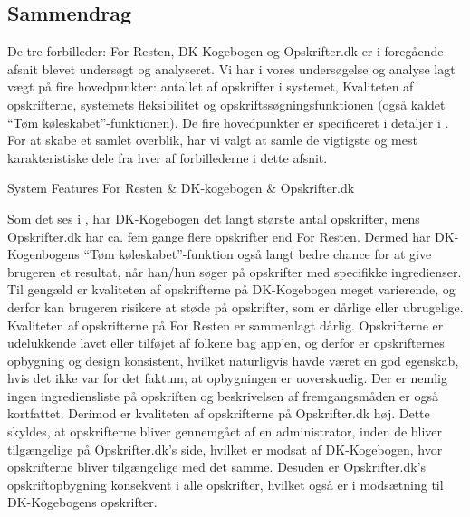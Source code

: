 \subsection{Sammendrag}
\label{subsec:eksisterende.sammendrag}

De tre forbilleder: For Resten, DK-Kogebogen og Opskrifter.dk er i foregående afsnit blevet undersøgt og analyseret. Vi har i vores undersøgelse og analyse lagt vægt på fire hovedpunkter: antallet af opskrifter i systemet, Kvaliteten af opskrifterne, systemets fleksibilitet og opskriftssøgningsfunktionen (også kaldet ``Tøm køleskabet''-funktionen). De fire hovedpunkter er specificeret i detaljer i . For at skabe et samlet overblik, har vi valgt at samle de vigtigste og mest karakteristiske dele fra hver af forbillederne i dette afsnit.

                                            {System}
       { Features                  }{ For Resten   & DK-kogebogen   & Opskrifter.dk }{
}

Som det ses i , har DK-Kogebogen det langt største antal opskrifter, mens Opskrifter.dk har ca. fem gange flere opskrifter end For Resten. Dermed har DK-Kogenbogens ``Tøm køleskabet''-funktion også langt bedre chance for at give brugeren et resultat, når han/hun søger på opskrifter med specifikke ingredienser. Til gengæld er kvaliteten af opskrifterne på DK-Kogebogen meget varierende, og derfor kan brugeren risikere at støde på opskrifter, som er dårlige eller ubrugelige. Kvaliteten af opskrifterne på For Resten er sammenlagt dårlig. Opskrifterne er udelukkende lavet eller tilføjet af folkene bag app’en, og derfor er opskrifternes opbygning og design konsistent, hvilket naturligvis havde været en god egenskab, hvis det ikke var for det faktum, at opbygningen er uoverskuelig. Der er nemlig ingen ingrediensliste på opskriften og beskrivelsen af fremgangsmåden er også kortfattet. Derimod er kvaliteten af opskrifterne på Opskrifter.dk høj. Dette skyldes, at opskrifterne bliver gennemgået af en administrator, inden de bliver tilgængelige på Opskrifter.dk’s side, hvilket er modsat af DK-Kogebogen, hvor opskrifterne bliver tilgængelige med det samme. Desuden er Opskrifter.dk’s opskriftopbygning konsekvent i alle opskrifter, hvilket også er i modsætning til DK-Kogebogens opskrifter.

